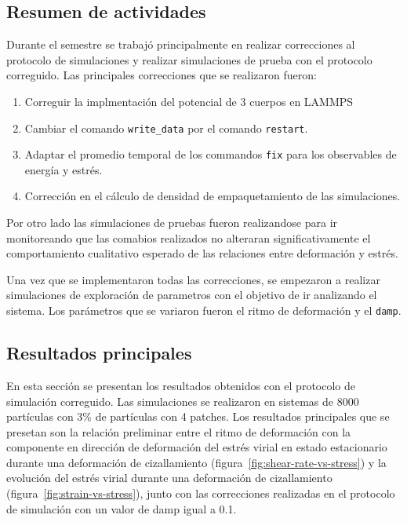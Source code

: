 \documentclass[../main.tex]{subfiles}
\begin{document}
\subsection{Resumen de actividades}

Durante el semestre se trabajó principalmente en realizar correcciones al protocolo de simulaciones y realizar simulaciones de prueba con el protocolo correguido.
Las principales correcciones que se realizaron fueron:
\begin{enumerate}
    \item Correguir la implmentación del potencial de 3 cuerpos en LAMMPS
    \item Cambiar el comando \texttt{write\_data} por el comando \texttt{restart}.
    \item Adaptar el promedio temporal de los commandos \texttt{fix} para los observables de energía y estrés.
    \item Corrección en el cálculo de densidad de empaquetamiento de las simulaciones.
\end{enumerate}
Por otro lado las simulaciones de pruebas fueron realizandose para ir monitoreando que las comabios realizados no alteraran significativamente el comportamiento cualitativo esperado de las relaciones entre deformación y estrés.

Una vez que se implementaron todas las correcciones, se empezaron a realizar simulaciones de exploración de parametros con el objetivo de ir analizando el sistema.
Los parámetros que se variaron fueron el ritmo de deformación y el \texttt{damp}.

\subsection{Resultados principales}

En esta sección se presentan los resultados obtenidos con el protocolo de simulación correguido.
Las simulaciones se realizaron en sistemas de \num{8000} partículas con \num{3}\% de partículas con 4 patches.
Los resultados principales que se presetan son la relación preliminar entre el ritmo de deformación con la componente en dirección de deformación del estrés virial en estado estacionario durante una deformación de cizallamiento (figura~\ref{fig:shear-rate-vs-stress}) y la evolución del estrés virial durante una deformación de cizallamiento (figura~\ref{fig:strain-vs-stress}), junto con las correcciones realizadas en el protocolo de simulación con un valor de damp igual a \num{0.1}.
\end{document}
